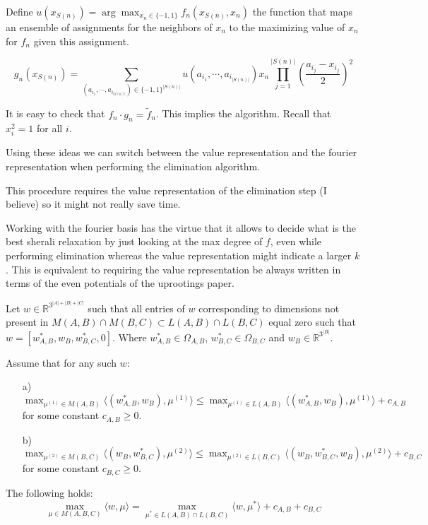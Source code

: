 Define $u(x_{S(n)}) = \arg\max_{x_n \in \{-1, 1\}} f_n(x_{S(n)}, x_n)$ the function that maps an ensemble of assignments for the neighbors of $x_n$ to the maximizing value of $x_n$ for $f_n$ given this assignment. 

\begin{equation}
g_n(x_{S(n)}) = \sum_{(a_{i_1}, \cdots, a_{i_{|S(n)|}}) \in \{-1,1\}^{|S(n)|}} u(a_{i_1}, \cdots, a_{i_{|S(n)|}}) x_n\prod_{j = 1}^{|S(n)|} \left(\frac{a_{i_j} - x_{i_j} }{2}\right)^2 
\end{equation}


It is easy to check that $f_n \cdot g_n = \tilde{f}_n$. This implies the algorithm. Recall that $x_i^2 = 1$ for all $i$. 

Using these ideas we can switch between the value representation and the fourier representation when performing the elimination algorithm. 

This procedure requires the value representation of the elimination step (I believe) so it might not really save time. 

Working with the fourier basis has the virtue that it allows to decide what is the best sherali relaxation by just looking at the max degree of $f$, even while performing elimination whereas the value representation might indicate a larger $k$. This is equivalent to requiring the value representation be always written in terms of the even potentials of the uprootings paper.











\begin{theorem}
Let $w \in \mathbb{R}^{3^{|A|+|B|+|C|}}$ such that all entries of $w$ corresponding to dimensions not present in $M(A,B) \cap M(B,C) \subset L(A,B) \cap L(B,C)$ equal zero such that $w = [w^*_{A,B}, w_B, w^*_{B,C}, 0]$. Where $w^*_{A,B} \in \Omega_{A,B}$, $w^*_{B,C} \in \Omega_{B,C}$ and $w_B \in \mathbb{R}^{3^|B|}$.  

Assume that for any such $w$: 
\begin{itemize}
\item[a)] $\max_{\mu^{(1)} \in M(A,B) } \langle (w^*_{A,B}, w_B), \mu^{(1)} \rangle \leq \max_{\mu^{(1)} \in L(A,B)} \langle (w^*_{A,B}, w_B), \mu^{(1)}\rangle + c_{A,B}$ for some constant $c_{A,B} \geq0$.
\item[b)] $\max_{\mu^{(2)} \in M(B,C) } \langle (w_B, w^*_{B,C}), \mu^{(2)} \rangle \leq \max_{\mu^{(2)} \in L(B,C)} \langle (w_B, w^*_{B,C}, w_B), \mu^{(2)}\rangle + c_{B,C}$ for some constant $c_{B,C} \geq 0$.
\end{itemize}

The following holds:
\begin{equation}
\max_{ \mu  \in M(A,B,C) } \langle w, \mu \rangle = \max_{ \mu^* \in L(A,B) \cap L(B,C)} \langle w, \mu^* \rangle + c_{A,B} + c_{B,C}
\end{equation}
\end{theorem}

